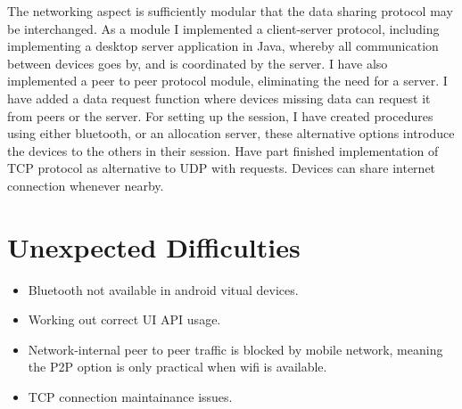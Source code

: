 \documentclass{article}
\begin{document}
The networking aspect is sufficiently modular that the data sharing protocol may be interchanged. As a module I implemented a client-server protocol, including implementing a desktop server application in Java, whereby all communication between devices goes by, and is coordinated by the server.
I have also implemented a peer to peer protocol module, eliminating the need for a server.
I have added a data request function where devices missing data can request it from peers or the server.
For setting up the session, I have created procedures using either bluetooth, or an allocation server, these alternative options introduce the devices to the others in their session.
Have part finished implementation of TCP protocol as alternative to UDP with requests.
Devices can share internet connection whenever nearby.

\section*{Unexpected Difficulties}
\begin{itemize}
\item{Bluetooth not available in android vitual devices.}
\item{Working out correct UI API usage.}
\item{Network-internal peer to peer traffic is blocked by mobile network, meaning the P2P option is only practical when wifi is available.}
\item{TCP connection maintainance issues.}
\end{itemize}
\end{document}
